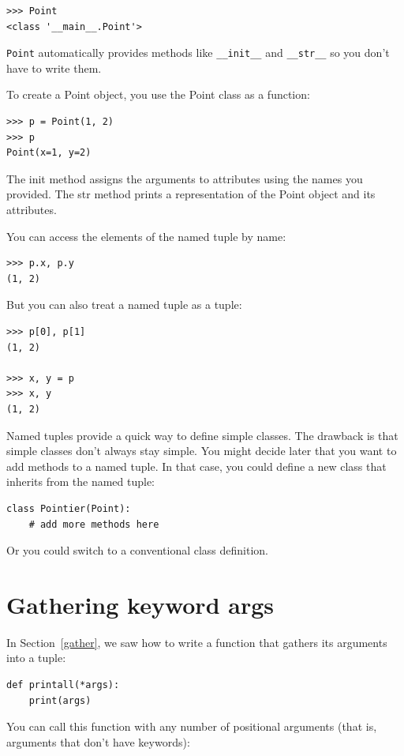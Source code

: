 \documentclass[10pt]{book}
\begin{document}
\begin{verbatim}
>>> Point
<class '__main__.Point'>
\end{verbatim}

{\tt Point} automatically provides methods like \verb"__init__" and
\verb"__str__" so you don't have to write them.

To create a Point object, you use the Point class as a function:

\begin{verbatim}
>>> p = Point(1, 2)
>>> p
Point(x=1, y=2)
\end{verbatim}

The init method assigns the arguments to attributes using the names
you provided.  The str method prints a representation of the Point
object and its attributes.

You can access the elements of the named tuple by name:

\begin{verbatim}
>>> p.x, p.y
(1, 2)
\end{verbatim}

But you can also treat a named tuple as a tuple:

\begin{verbatim}
>>> p[0], p[1]
(1, 2)

>>> x, y = p
>>> x, y
(1, 2)
\end{verbatim}

Named tuples provide a quick way to define simple classes.
The drawback is that simple classes don't always stay simple.
You might decide later that you want to add methods to a named tuple.
In that case, you could define a new class that inherits from
the named tuple:

\begin{verbatim}
class Pointier(Point):
    # add more methods here
\end{verbatim}

Or you could switch to a conventional class definition.


\section{Gathering keyword args}

In Section~\ref{gather}, we saw how to write a function that
gathers its arguments into a tuple:

\begin{verbatim}
def printall(*args):
    print(args)
\end{verbatim}
%
You can call this function with any number of positional arguments
(that is, arguments that don't have keywords):
\end{document}
